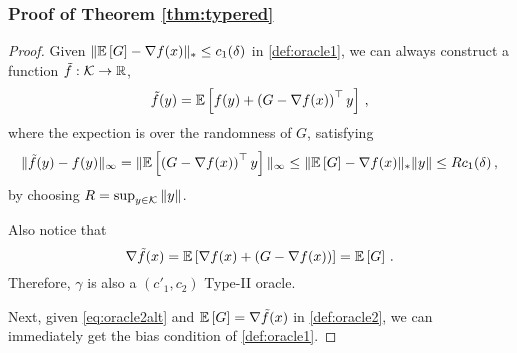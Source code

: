 
\subsubsection*{Proof of Theorem \ref{thm:typered}}
\begin{proof}
Given $\| \mathbb{E}\left[G\right]  - \nabla f(x)  \|_* \le c_1(\delta) $ in \cref{def:oracle1}, we can always construct a function $\tilde{f}:\mathcal{K} \to \mathbb{R}$,
\[
\tilde{f}(y) =\mathbb{E}\left[ f(y)+ \left( G-\nabla f(x) \right)^\top y\right] \,,
\]
where the expection is over the randomness of $G$, satisfying
\begin{align*}
\|\tilde{f}(y)-f(y)\|_{\infty}
=
 \| \mathbb{E}\left[\left( G-\nabla f(x) \right)^\top y\right]\|_{\infty}
 \le \|\mathbb{E}\left[G\right]-\nabla f(x)\|_* \|y\|
 \le  Rc_1(\delta)\,,
\end{align*}
by choosing $R = \sup_{y \in \mathcal{K}}\|y\|$.

Also notice that
\[
 \nabla \tilde{f}(x) = \mathbb{E}\left[\nabla f(x)+ \left( G-\nabla f(x)\right)\right]
 =\mathbb{E}\left[G\right]\,.
\]
Therefore, $\gamma$ is also a $(c'_1,c_2)$ Type-II oracle.

Next, given \eqref{eq:oracle2alt} and $\mathbb{E}\left[G\right]=\nabla \tilde{f}(x)$ in \cref{def:oracle2}, we can immediately get the bias condition of \cref{def:oracle1}.
\end{proof}
